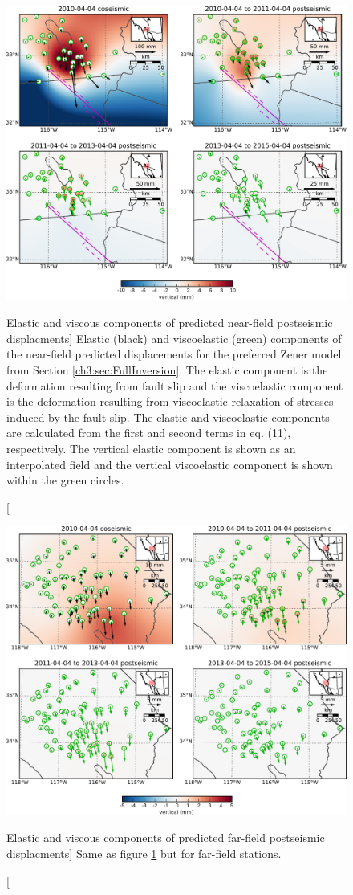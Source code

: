 \begin{figure}
\noindent\includegraphics[scale=0.9]{ch3/figures/2016jb013114-pS03}
\caption
[Elastic and viscous components of predicted near-field postseismic
displacments]
{Elastic (black) and viscoelastic (green) components of the
near-field predicted displacements for the preferred Zener model from
Section \ref{ch3:sec:FullInversion}.  The elastic component is the deformation resulting from
fault slip and the viscoelastic component is the deformation resulting
from viscoelastic relaxation of stresses induced by the fault slip.
The elastic and viscoelastic components are calculated from the first
and second terms in eq. (11), respectively.  The vertical elastic
component is shown as an interpolated field and the vertical
viscoelastic component is shown within the green circles.}
\label{ch3:fig:S3}
\end{figure}

\begin{figure}
\noindent\includegraphics[scale=0.9]{ch3/figures/2016jb013114-pS04}
\caption
[Elastic and viscous components of predicted far-field postseismic
displacments]
{Same as figure \ref{ch3:fig:S3} but for far-field stations.}
\label{ch3:fig:S4}
\end{figure}

